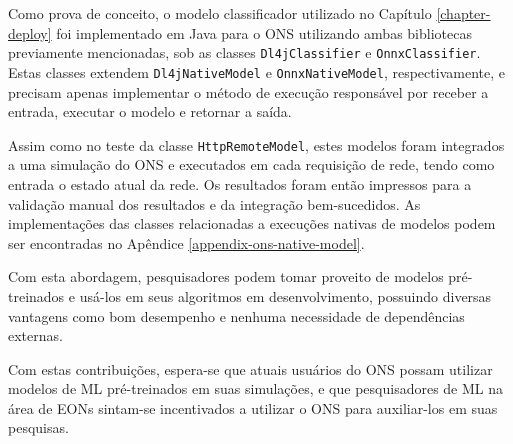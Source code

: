Como prova de conceito, o modelo classificador utilizado no Capítulo \ref{chapter-deploy} foi implementado em Java para o ONS utilizando ambas bibliotecas previamente mencionadas, sob as classes \texttt{Dl4jClassifier} e \texttt{OnnxClassifier}. Estas classes extendem \texttt{Dl4jNativeModel} e \texttt{OnnxNativeModel}, respectivamente, e precisam apenas implementar o método de execução responsável por receber a entrada, executar o modelo e retornar a saída.

Assim como no teste da classe \texttt{HttpRemoteModel}, estes modelos foram integrados a uma simulação do ONS e executados em cada requisição de rede, tendo como entrada o estado atual da rede. Os resultados foram então impressos para a validação manual dos resultados e da integração bem-sucedidos. As implementações das classes relacionadas a execuções nativas de modelos podem ser encontradas no Apêndice \ref{appendix-ons-native-model}.

Com esta abordagem, pesquisadores podem tomar proveito de modelos pré-treinados e usá-los em seus algoritmos em desenvolvimento, possuindo diversas vantagens como bom desempenho e nenhuma necessidade de dependências externas.

Com estas contribuições, espera-se que atuais usuários do ONS possam utilizar modelos de ML pré-treinados em suas simulações, e que pesquisadores de ML na área de EONs sintam-se incentivados a utilizar o ONS para auxiliar-los em suas pesquisas.
